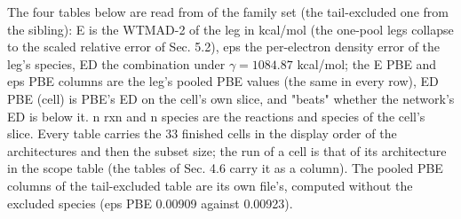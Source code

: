 \documentclass[10pt,a4paper]{article}
\begin{document}
The four tables below are read from  of the family  set (the tail-excluded one from the  sibling): E is the WTMAD-2 of the leg in kcal/mol (the one-pool legs collapse to the scaled relative error of Sec. 5.2), eps the per-electron density error of the leg's species, ED the combination under $\gamma = 1084.87$ kcal/mol; the E PBE and eps PBE columns are the leg's pooled PBE values (the same in every row), ED PBE (cell) is PBE's ED on the cell's own slice, and "beats" whether the network's ED is below it. n rxn and n species are the reactions and species of the cell's slice. Every table carries the 33 finished cells in the display order of the architectures and then the subset size; the run of a cell is that of its architecture in the scope table (the tables of Sec. 4.6 carry it as a column). The pooled PBE columns of the tail-excluded table are its own file's, computed without the excluded species (eps PBE 0.00909 against 0.00923).
\end{document}
